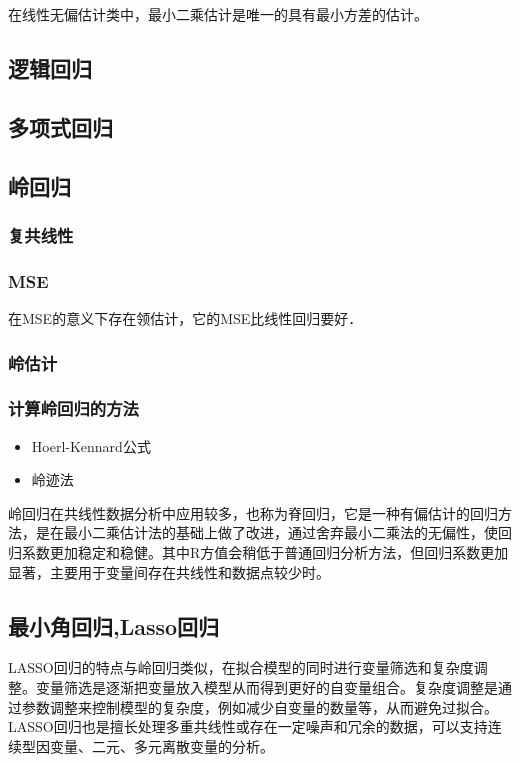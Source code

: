 \documentclass{amsart}
\begin{document}
\begin{theorem}
  在线性无偏估计类中，最小二乘估计是唯一的具有最小方差的估计。
\end{theorem}

\subsection{逻辑回归}

\subsection{多项式回归}

\subsection{岭回归}

\subsubsection{复共线性}

\subsubsection{MSE}

\begin{theorem}
  在MSE的意义下存在领估计，它的MSE比线性回归要好．
\end{theorem}

\subsubsection{岭估计}

\subsubsection{计算岭回归的方法}
\begin{itemize}
\item Hoerl-Kennard公式
\item 岭迹法
\end{itemize}

岭回归在共线性数据分析中应用较多，也称为脊回归，它是一种有偏估计的回归方法，是在最小二乘估计法的基础上做了改进，通过舍弃最小二乘法的无偏性，使回归系数更加稳定和稳健。其中R方值会稍低于普通回归分析方法，但回归系数更加显著，主要用于变量间存在共线性和数据点较少时。
\subsection{最小角回归,Lasso回归}
LASSO回归的特点与岭回归类似，在拟合模型的同时进行变量筛选和复杂度调整。变量筛选是逐渐把变量放入模型从而得到更好的自变量组合。复杂度调整是通过参数调整来控制模型的复杂度，例如减少自变量的数量等，从而避免过拟合。LASSO回归也是擅长处理多重共线性或存在一定噪声和冗余的数据，可以支持连续型因变量、二元、多元离散变量的分析。
\end{document}
